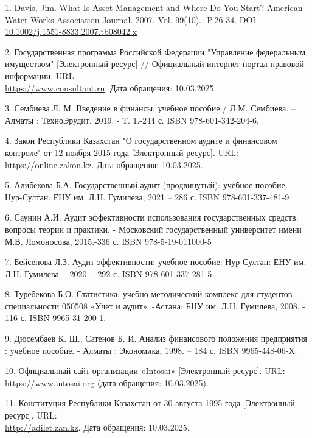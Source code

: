 \begin{references}
1. Davis, Jim. What Is Asset Management and Where Do You Start? American
Water Works Association Journal.-2007.-Vol. 99(10). -P.26-34. DOI
\href{http://dx.doi.org/10.1002/j.1551-8833.2007.tb08042.x}{10.1002/j.1551-8833.2007.tb08042.x}

2. Государственная программа Российской Федерации "Управление федеральным
имуществом" {[}Электронный ресурс{]} // Официальный интернет-портал
правовой информации. URL:\\
\href{https://www.consultant.ru/document/cons\_doc\_LAW\_155198/}{https://www.consultant.ru}. Дата
обращения: 10.03.2025.

3. Сембиева Л. М. Введение в финансы: учебное пособие / Л.М. Сембиева. --
Алматы : ТехноЭрудит, 2019. - Т. 1.-244 с. ISBN 978-601-342-204-6.

4. Закон Республики Казахстан "О государственном аудите и финансовом
контроле" от 12 ноября 2015 года {[}Электронный ресурс{]}. URL:
\href{https://online.zakon.kz/document/?doc_id=37724730}{https://online.zakon.kz}. Дата
обращения: 10.03.2025.

5. Алибекова Б.А. Государственный аудит (продвинутый): учебное пособие. -
Нур-Султан: ЕНУ им. Л.Н. Гумилева, 2021 -- 286 с. ISBN
978-601-337-481-9

6. Саунин А.И. Аудит эффективности использования государственных средств:
вопросы теории и практики. - Московский государственный университет
имени М.В. Ломоносова, 2015.-336 с. ISBN 978-5-19-011000-5

7. Бейсенова Л.З. Аудит эффективности: учебное пособие. Нур-Султан: ЕНУ
им. Л.Н. Гумилева. - 2020. - 292 с. ISBN 978-601-337-281-5.

8. Туребекова Б.О. Статистика: учебно-методический комплекс для студентов
специальности 050508 «Учет и аудит». -Астана: ЕНУ им. Л.Н. Гумилева,
2008. - 116 с. ISBN 9965-31-200-1.

9. Дюсембаев К. Ш., Сатенов Б. И. Анализ финансового положения
предприятия : учебное пособие. - Алматы : Экономика, 1998. -- 184 с.
ISBN 9965-448-06-Х.

10. Официальный сайт организации «Intosai» {[}Электронный ресурс{]}. URL:
\href{https://www.intosai.org}{https://www.intosai.org} (дата обращения: 10.03.2025).

11. Конституция Республики Казахстан от 30 августа 1995 года
{[}Электронный ресурс{]}. URL:\\
\href{http://adilet.zan.kz/rus/docs/K950001000_\#z42}{http://adilet.zan.kz}. Дата обращения:
10.03.2025.


\end{references}
